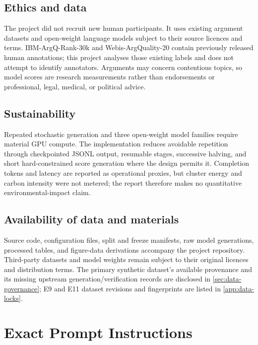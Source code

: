 \documentclass[11pt,twoside,a4paper]{report}
\begin{document}
\section*{Ethics and data}

The project did not recruit new human participants.  It uses existing argument
datasets and open-weight language models subject to their source licences and terms.
IBM-ArgQ-Rank-30k and Webis-ArgQuality-20 contain previously released human
annotations; this project analyses those existing labels and does not attempt to
identify annotators.  Arguments may concern contentious topics, so model scores are
research measurements rather than endorsements or professional, legal, medical, or
political advice.

\section*{Sustainability}

Repeated stochastic generation and three open-weight model families require material
GPU compute.  The implementation reduces avoidable repetition through checkpointed
JSONL output, resumable stages, successive halving, and short hard-constrained score
generation where the design permits it.  Completion tokens and latency are reported
as operational proxies, but cluster energy and carbon intensity were not metered;
the report therefore makes no quantitative environmental-impact claim.

\section*{Availability of data and materials}

Source code, configuration files, split and freeze manifests, raw model generations,
processed tables, and figure-data derivations accompany the project repository.
Third-party datasets and model weights remain subject to their original licences and
distribution terms.  The primary synthetic dataset's available provenance and its
missing upstream generation/verification records are disclosed in
\cref{sec:data-governance}; E9 and E11 dataset revisions and fingerprints are listed
in \cref{app:data-locks}.


\appendix

\chapter{Exact Prompt Instructions}
\label{app:prompts}
\end{document}

